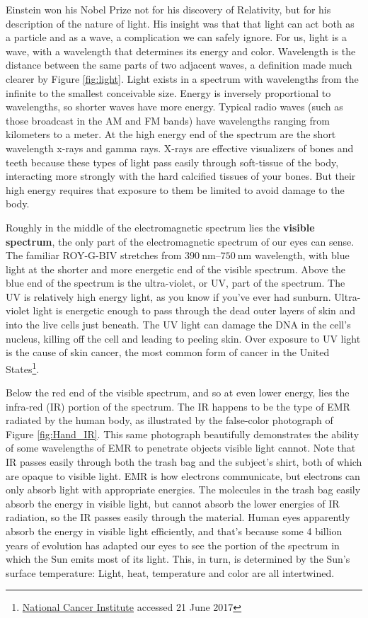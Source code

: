 Einstein won his Nobel Prize not for his discovery of Relativity, but for his description of the nature of light. His insight was that that light can act both as a particle and as a wave, a complication we can safely ignore. For us, light is a wave, with a wavelength that determines its energy and color. Wavelength is the distance between the same parts of two adjacent waves, a definition made much clearer by Figure \ref{fig:light}. Light exists in a spectrum with wavelengths from the infinite to the smallest conceivable size. Energy is inversely proportional to wavelengths, so shorter waves have more energy. Typical radio waves (such as those broadcast in the AM and FM bands) have wavelengths ranging from kilometers to a meter. At the high energy end of the spectrum are the short wavelength x-rays and gamma rays. X-rays are effective visualizers of bones and teeth because these types of light pass easily through soft-tissue of the body, interacting more strongly with the hard calcified tissues of your bones. But their high energy requires that exposure to them be limited to avoid damage to the body.

Roughly in the middle of the electromagnetic spectrum lies the \textbf{visible spectrum}, the only part of the electromagnetic spectrum of our eyes can sense. The familiar ROY-G-BIV stretches from $\SIrange{390 }{ 750}{\nano\metre}$ wavelength, with blue light at the shorter and more energetic end of the visible spectrum. Above the blue end of the spectrum is the ultra-violet, or UV, part of the spectrum. The UV is relatively high energy light, as you know if you've ever had sunburn. Ultra-violet light is energetic enough to pass through the dead outer layers of skin and into the live cells just beneath. The UV light can damage the DNA in the cell's nucleus, killing off the cell and leading to peeling skin. Over exposure to UV light is the cause of skin cancer, the most common form of cancer in the United States\footnote{\href{https://www.cancer.gov/types/skin}{National Cancer Institute} accessed 21 June 2017}.
 
Below the red end of the visible spectrum, and so at even lower energy, lies the infra-red (IR) portion of the spectrum. The IR happens to be the type of EMR radiated by the human body, as illustrated by the false-color photograph of Figure \ref{fig:Hand_IR}. This same photograph beautifully demonstrates the ability of some wavelengths of EMR to penetrate objects visible light cannot. Note that IR passes easily through both the trash bag and the subject's shirt, both of which are opaque to visible light. EMR is how electrons communicate, but electrons can only absorb light with appropriate energies. The molecules in the trash bag easily absorb the energy in visible light, but cannot absorb the lower energies of IR radiation, so the IR passes easily through the material. Human eyes apparently absorb the energy in visible light efficiently, and that's because some 4 billion years of evolution has adapted our eyes to see the portion of the spectrum in which the Sun emits most of its light. This, in turn, is determined by the Sun's surface temperature: Light, heat, temperature and color are all intertwined.

